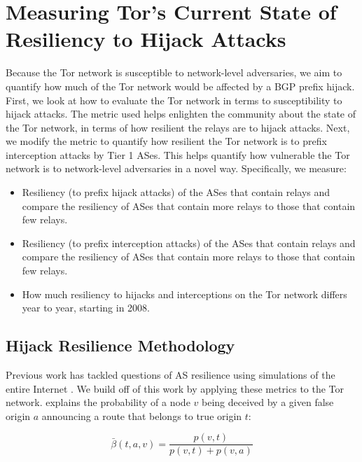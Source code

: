 \section{Measuring Tor's Current State of Resiliency to Hijack Attacks}
\label{hijack_interception_measurement}

Because the Tor network is susceptible to network-level adversaries, we aim to quantify how much of the Tor network would be affected by a BGP prefix hijack.  First, we look at how to evaluate the Tor network in terms to susceptibility to hijack attacks.  The metric used helps enlighten the community about the state of the Tor network, in terms of how resilient the relays are to hijack attacks.  Next, we modify the metric to quantify how resilient the Tor network is to prefix interception attacks by Tier 1 ASes.  This helps quantify how vulnerable the Tor network is to network-level adversaries in a novel way.  Specifically, we measure:

\begin{itemize}
\item Resiliency (to prefix hijack attacks) of the ASes that contain relays and compare the resiliency of ASes that contain more relays to those that contain few relays.
\item Resiliency (to prefix interception attacks) of the ASes that contain relays and compare the resiliency of ASes that contain more relays to those that contain few relays.
\item How much resiliency to hijacks and interceptions on the Tor network differs year to year, starting in 2008.
\end{itemize}

\subsection{Hijack Resilience Methodology}
\label{hijack_methodology}

Previous work has tackled questions of AS resilience using simulations of the entire Internet \cite{lad2007understanding}.  We build off of this work by applying these metrics to the Tor network.  \cite{lad2007understanding} explains the probability of a node $v$ being deceived by a given false origin $a$ announcing a route that belongs to true origin $t$:

\begin{equation}
\bar{\beta}(t,a,v) = \frac {p(v,t)} {p(v,t) + p(v,a)}
\end{equation}

